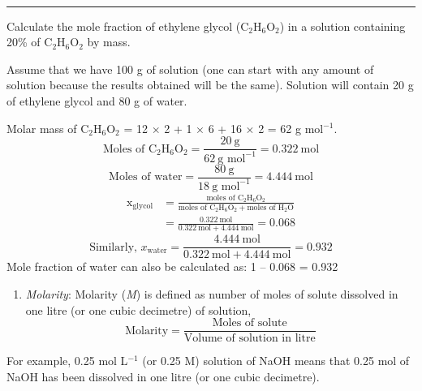 \documentclass[11pt,a4paper]{article}
\begin{document}
\begin{tcolorbox}[enhanced,colback=white,colframe=gray!40,boxrule=0.8pt,arc=2mm,left=24pt,right=8pt,top=4pt,bottom=6pt,boxsep=0pt,drop fuzzy shadow=gray!40,overlay={\fill[SkyBlue] (frame.south west) rectangle ([xshift=14pt]frame.north west);}]
\noindent\begin{minipage}[t]{0.17\linewidth}
\\[-3pt]
{\color{DeepSkyBlue3}\rule{\linewidth}{0.8pt}}
\end{minipage}\hfill
\begin{minipage}[t]{0.81\linewidth}
Calculate the mole fraction of ethylene glycol (C$_2$H$_6$O$_2$) in a solution containing 20\% of C$_2$H$_6$O$_2$ by mass.
\end{minipage}

\vspace{8pt}
\noindent\begin{minipage}[t]{0.17\linewidth}
\end{minipage}\hfill
\begin{minipage}[t]{0.81\linewidth}
Assume that we have 100 g of solution (one can start with any amount of solution because the results obtained will be the same). Solution will contain 20 g of ethylene glycol and 80 g of water.

Molar mass of C$_2$H$_6$O$_2$ = 12 $\times$ 2 + 1 $\times$ 6 + 16 $\times$ 2 = 62 g mol$^{-1}$.
\[ \text{Moles of C}_2\text{H}_6\text{O}_2 = \frac{20\ \text{g}}{62\ \text{g mol}^{-1}} = 0.322\ \text{mol} \]
\[ \text{Moles of water} = \frac{80\ \text{g}}{18\ \text{g mol}^{-1}} = 4.444\ \text{mol} \]
\[ \begin{aligned}
\text{x}_{\text{glycol}} &= \frac{\text{moles of C}_2\text{H}_6\text{O}_2}{\text{moles of C}_2\text{H}_6\text{O}_2 + \text{moles of H}_2\text{O}}\\[4pt]
&= \frac{0.322\ \text{mol}}{0.322\ \text{mol} + 4.444\ \text{mol}} = 0.068
\end{aligned} \]
\[ \text{Similarly, } x_{\text{water}} = \frac{4.444\ \text{mol}}{0.322\ \text{mol} + 4.444\ \text{mol}} = 0.932 \]
Mole fraction of water can also be calculated as: 1 -- 0.068 = 0.932
\end{minipage}
\end{tcolorbox}

\vspace{4pt}
\noindent\hfill\begin{minipage}[t]{0.74\textwidth}
\begin{enumerate}[label=(\roman*),leftmargin=24pt,topsep=0pt,start=6]
\item \textit{Molarity}: Molarity (\textit{M}) is defined as number of moles of solute dissolved in one litre (or one cubic decimetre) of solution,
\[ \text{Molarity} = \frac{\text{Moles of solute}}{\text{Volume of solution in litre}} \tag{1.8} \]
\end{enumerate}
\hspace*{2.5em}For example, 0.25 mol L$^{-1}$ (or 0.25 M) solution of NaOH means that 0.25 mol of NaOH has been dissolved in one litre (or one cubic decimetre).
\end{minipage}
\end{document}
